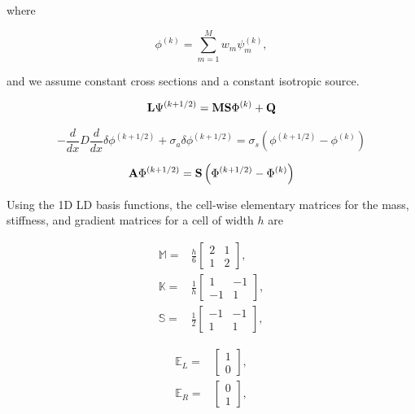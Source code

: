 \noindent where

\begin{equation}
\label{eq::App_DSA_1D_angint}
\phi^{(k)} = \sum_{m=1}^M w_m \psi_m^{(k)},
\end{equation}

\noindent and we assume constant cross sections and a constant isotropic source.

\begin{equation}
\label{eq::App_DSA_1D_transport_ops}
{\bf L} \Psi^{(k+1/2)} = {\bf M} {\bf S} \Phi^{(k)}  + {\bf Q}
\end{equation}

\begin{equation}
\label{eq::App_DSA_1D_diff_eq}
- \frac{d}{dx} D \frac{d }{dx} \delta \phi^{(k+1/2)}+ \sigma_a \delta \phi^{(k+1/2)} = \sigma_s \left(  \phi^{(k+1/2)} - \phi^{(k)} \right)
\end{equation}

\begin{equation}
\label{eq::App_DSA_1D_diff_ops}
{\bf A} \Phi^{(k+1/2)} = {\bf S}\left( \Phi^{(k+1/2)} -  \Phi^{(k)}   \right)
\end{equation}

Using the 1D LD basis functions, the cell-wise elementary matrices for the mass, stiffness, and gradient matrices for a cell of width $h$ are

\begin{equation}
\label{eq::App_DSA_MIP_1D_cell_matrices}
\begin{aligned}
	\mathbb{M} =& \frac{h}{6}
	\left[ \begin{array}{cc}
	2 & 1 \\
	1 & 2 
	\end{array} \right] ,\\
	\mathbb{K} =& \frac{1}{h}
	\left[ \begin{array}{cc}
	1 & -1 \\
	-1 & 1 
	\end{array} \right] ,\\
	\mathbb{S} =& \frac{1}{2}
	\left[ \begin{array}{cc}
	-1 & -1 \\
	 1 & 1 
	\end{array} \right] ,
\end{aligned}
\end{equation}

\begin{equation}
\label{eq::App_DSA_MIP_1D_facemass_matrices}
\begin{aligned}
	\mathbb{E}_L =& 
	\left[ \begin{array}{c}
	1  \\
	0 
	\end{array} \right] ,\\
	\mathbb{E}_R =& 
	\left[ \begin{array}{c}
	0  \\
	1
	\end{array} \right] ,
\end{aligned}
\end{equation}


